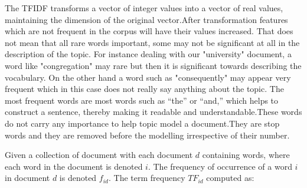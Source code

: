 The TFIDF transforms a vector of integer values into a vector of real values, maintaining the dimension of the original vector.After transformation  features which are not frequent in the corpus will have their values increased. That does not mean that  all rare words important, some may not be significant at all in the description of the topic.
For instance dealing with our "university" document, a word like "congregation" may rare but then it is significant towards describing the vocabulary. On the other hand a word such as "consequently" may appear very frequent which in this case does not really say anything about the topic. The most frequent words are
most words such as “the” or “and,” which helps to construct a sentence, thereby making it readable and understandable.These words do not carry any importance to help topic model a document.They are stop words and they are removed before the modelling irrespective of their number.

 Given a collection of document with each document $d$ containing words, where each word in the document is denoted $i$. The frequency of occurrence of a word $i$ in document $d$ is denoted $f_{id}$. The term frequency $TF_{id}$ computed as:
 
